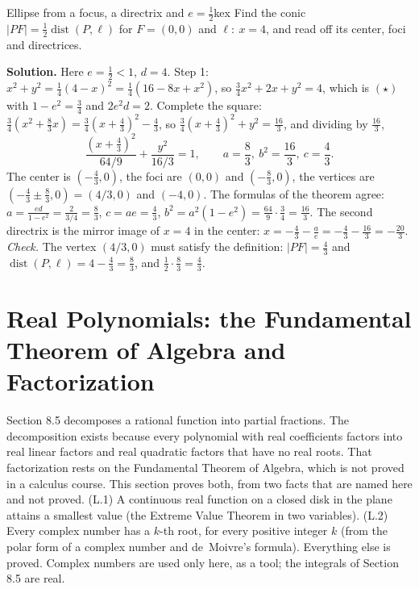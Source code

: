 \documentclass[11pt]{article}
\begin{document}
\begin{exmp}{Ellipse from a focus, a directrix and $e=\frac12$}{kex}
Find the conic $\lvert PF\rvert=\frac12\operatorname{dist}(P,\ell)$ for $F=(0,0)$ and $\ell:\ x=4$, and read off its center, foci and directrices.

\textbf{Solution.} Here $e=\frac12<1$, $d=4$. Step 1: $x^2+y^2=\frac14(4-x)^2=\frac14\left(16-8x+x^2\right)$, so $\frac34x^2+2x+y^2=4$, which is $(\star)$ with $1-e^2=\frac34$ and $2e^2d=2$. Complete the square: $\frac34\left(x^2+\frac83x\right)=\frac34\left(x+\frac43\right)^2-\frac43$, so $\frac34\left(x+\frac43\right)^2+y^2=\frac{16}3$, and dividing by $\frac{16}3$,
\[
\frac{\left(x+\frac43\right)^2}{64/9}+\frac{y^2}{16/3}=1,\qquad a=\frac83,\ b^2=\frac{16}3,\ c=\frac43 .
\]
The center is $\left(-\frac43,0\right)$, the foci are $(0,0)$ and $\left(-\frac83,0\right)$, the vertices are $\left(-\frac43\pm\frac83,0\right)=(4/3,0)$ and $(-4,0)$. The formulas of the theorem agree: $a=\frac{ed}{1-e^2}=\frac{2}{3/4}=\frac83$, $c=ae=\frac43$, $b^2=a^2(1-e^2)=\frac{64}9\cdot\frac34=\frac{16}3$. The second directrix is the mirror image of $x=4$ in the center: $x=-\frac43-\frac ae=-\frac43-\frac{16}3=-\frac{20}3$.
\emph{Check.} The vertex $(4/3,0)$ must satisfy the definition: $\lvert PF\rvert=\frac43$ and $\operatorname{dist}(P,\ell)=4-\frac43=\frac83$, and $\frac12\cdot\frac83=\frac43$.
\end{exmp}

\section{Real Polynomials: the Fundamental Theorem of Algebra and Factorization}

Section 8.5 decomposes a rational function into partial fractions. The decomposition exists because every polynomial with real coefficients factors into real linear factors and real quadratic factors that have no real roots. That factorization rests on the Fundamental Theorem of Algebra, which is not proved in a calculus course. This section proves both, from two facts that are named here and not proved. (L.1) A continuous real function on a closed disk in the plane attains a smallest value (the Extreme Value Theorem in two variables). (L.2) Every complex number has a $k$-th root, for every positive integer $k$ (from the polar form of a complex number and de~Moivre's formula). Everything else is proved. Complex numbers are used only here, as a tool; the integrals of Section 8.5 are real.
\end{document}
